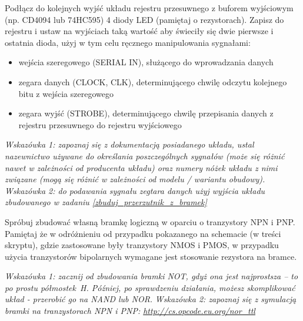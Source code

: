 \vspace{2mm}\noindent{}
\fi

\dbEntryCheckResults
Podłącz do kolejnych wyjść układu rejestru przesuwnego z buforem wyjściowym (np. CD4094 lub 74HC595) 4 diody LED (pamiętaj o rezystorach).
Zapisz do rejestru i ustaw na wyjściach taką wartość aby świeciły się dwie pierwsze i ostatnia dioda, użyj w tym celu ręcznego manipulowania sygnałami:
\begin{itemize}
\item wejścia szeregowego (SERIAL IN), służącego do wprowadzania danych
\item zegara danych (CLOCK, CLK), determinującego chwilę odczytu kolejnego bitu z wejścia szeregowego
\item zegara wyjść (STROBE), determinującego chwilę przepisania danych z rejestru przesuwnego do rejestru wyjściowego
\end{itemize}

\textit{Wskazówka 1: zapoznaj się z dokumentacją posiadanego układu, ustal nazewnictwo używane do określania poszczególnych sygnałów (może się różnić nawet w zależności od producenta układu) oraz numery nóżek układu z nimi związane (mogą się różnić w zależności od modelu / wariantu obudowy).}
\textit{Wskazówka 2: do podawania sygnału zegtara danych użyj wyjścia układu zbudowanego w zadaniu \ref{zbuduj_przerzutnik_z_bramek}}
\fi

\dbEntryCheckResults
Spróbuj zbudować własną bramkę logiczną w oparciu o tranzystory NPN i PNP. Pamiętaj że w odróżnieniu od przypadku pokazanego na schemacie (w treści skryptu), gdzie zastosowane były tranzystory NMOS i PMOS, w przypadku użycia tranzystorów bipolarnych wymagane jest stosowanie rezystora na bramce.

\textit{Wskazówka 1: zacznij od zbudowania bramki NOT, gdyż ona jest najprostsza – to po prostu półmostek H. Później, po sprawdzeniu działania, możesz skomplikować układ - przerobić go na NAND lub NOR.}
\textit{Wskazówka 2: zapoznaj się z symulacją bramki na tranzystorach NPN i PNP: \url{http://cs.opcode.eu.org/nor_ttl}}
\fi
